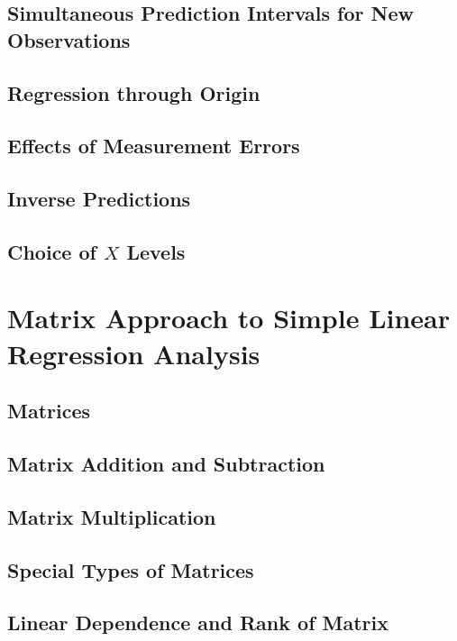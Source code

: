 \subsection{Simultaneous Prediction Intervals for New Observations}

\subsection{Regression through Origin}

\subsection{Effects of Measurement Errors}

\subsection{Inverse Predictions}

\subsection{Choice of $X$ Levels}


\section{Matrix Approach to Simple Linear Regression Analysis}
\subsection{Matrices}

\subsection{Matrix Addition and Subtraction}

\subsection{Matrix Multiplication}

\subsection{Special Types of Matrices}

\subsection{Linear Dependence and Rank of Matrix}

